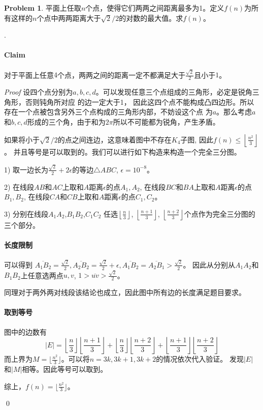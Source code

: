 \documentclass[UTF8]{ctexart}
\newenvironment{sol}
  {\par\vspace{3mm}\noindent{\it Solution}.}
  {\qed \\ \medskip}
\theoremstyle{definition}
\newtheorem{problem}{Problem}
\begin{document}
\begin{problem}
平面上任取$n$个点，使得它们两两之间距离最多为1。定义$f(n)$为所有这样的$n$个点中两两距离大于$\sqrt{2}/2$的对数的最大值。求$f(n)$。
\begin{sol}
  \paragraph{Claim} 对于平面上任意$4$个点，两两之间的距离一定不都满足大于$\frac{\sqrt{2}} 2$且小于$1$。
  
  \textit{Proof} 设四个点分别为$a, b, c, d$。可以发现任意三个点组成的三角形，必定是锐角三角形，否则钝角所对应
  的边一定大于1， 因此这四个点不能构成凸四边形。所以存在一个点被包含另外三个点构成的三角形内部，不妨设这个点
  为$a$。那么考虑$a$和$b,c,d$形成的三个角，由于和为$2\pi$所以不可能都为锐角，产生矛盾。\newline

  如果将小于$\sqrt{2}/2$的点之间连边，这意味着图中不存在$K_4$子图, 因此$f(n) \leq \left\lfloor \frac {n^2} 3\right\rfloor$。
  并且等号是可以取到的。我们可以进行如下构造来构造一个完全三分图。
  
  1) 取一边长为$\frac {\sqrt{2}} 2 + 2\epsilon$的等边$\triangle ABC$, $\epsilon = 10^{-8}$。

  2) 
  在线段$AB$和$AC$上取和$A$距离$\epsilon$的点$A_1, A_2$, 
  在线段$BC$和$BA$上取和$A$距离$\epsilon$的点$B_1, B_2$,
  在线段$CA$和$CB$上取和$A$距离$\epsilon$的点$C_1, C_2$。

  3) 分别在线段$A_1A_2$,$B_1B_2$,$C_1C_2$
  任选$\left\lfloor \frac n 3 \right\rfloor$,
  $\left\lfloor \frac {n+1} 3 \right\rfloor$,
  $\left\lfloor \frac {n+2} 3 \right\rfloor$个点作为完全三分图的三个部分。

  \paragraph{长度限制}
  可以得到
  $\overline{A_1B_2} = \frac {\sqrt{2}} 2, 
   \overline{A_2B_2} = \frac {\sqrt{2}} 2 + \epsilon, 
   \overline{A_1B_2}=\overline{A_2B_1} > \frac {\sqrt{2}} 2$。
   因此从分别从$A_1A_2$和$B_1B_2$上任意选两点$u, v$, $1 > \overline{uv} > \frac {\sqrt{2}} 2$。

   同理对于两外两对线段该结论也成立，因此图中所有边的长度满足题目要求。

   \paragraph{取到等号} 图中的边数有
   $$
   |E| = \left\lfloor \frac n 3 \right\rfloor \left\lfloor \frac {n+1} 3 \right\rfloor 
   +
   \left\lfloor \frac n 3 \right\rfloor \left\lfloor \frac {n+2} 3 \right\rfloor 
   +
   \left\lfloor \frac {n+1} 3 \right\rfloor \left\lfloor \frac {n+2} 3 \right\rfloor 
   $$
   而上界为$M=\lfloor \frac {n^2} 3 \rfloor$。可以将$n=3k,3k+1,3k+2$的情况依次代入验证。
  发现$|E|$和$|M|$相等。因此等号可以取到。

  综上，$f(n)=\lfloor \frac {n^2} 3 \rfloor$。

   

\end{sol}
\end{problem}
\end{document}
